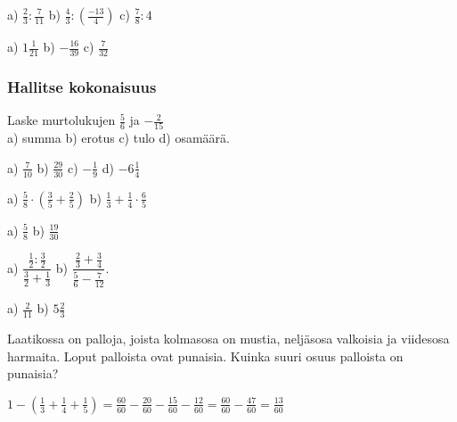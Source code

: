 \begin{tehtavasivu}
\begin{tehtava}
a) $\frac{2}{3} : \frac{7}{11}$ \qquad b) $\frac{4}{3}:(\frac{-13}{4})$ \qquad c) $\frac{7}{8}:4$
\begin{vastaus}
a) $1\frac{1}{21}$ \qquad b) $-\frac{16}{39}$ \qquad c) $\frac{7}{32}$
\end{vastaus}
\end{tehtava}

\subsubsection*{Hallitse kokonaisuus}

\begin{tehtava}
Laske murtolukujen $\frac{5}{6}$ ja $-\frac{2}{15}$ \\ a) summa \qquad b) erotus \qquad c) tulo \qquad d) osamäärä.
\begin{vastaus}
a) $\frac{7}{10}$ \qquad b) $\frac{29}{30}$ \qquad c) $-\frac{1}{9}$ \qquad d) $-6\frac{1}{4}$
\end{vastaus}
\end{tehtava}

\begin{tehtava}
a) $\frac{5}{8}\cdot(\frac{3}{5}+\frac{2}{5})$ \qquad b) $\frac{1}{3}+\frac{1}{4}\cdot\frac{6}{5}$
\begin{vastaus}
a) $\frac{5}{8}$ \qquad b) $\frac{19}{30}$
\end{vastaus}
\end{tehtava}

\begin{tehtava}
a) $\dfrac{\frac{1}{2}:\frac{3}{2}}{\frac{3}{2}+\frac{1}{3}}$ \qquad b) $\dfrac{\frac{2}{3}+\frac{3}{4}}{\frac{5}{6}-\frac{7}{12}}$.
\begin{vastaus}
a) $\frac{2}{11}$ \qquad b) $5\frac{2}{3}$
\end{vastaus}
\end{tehtava}

\begin{tehtava} 
        Laatikossa on palloja, joista kolmasosa on mustia, neljäsosa
        valkoisia ja viidesosa harmaita. Loput palloista ovat 		 	punaisia.
        Kuinka suuri osuus palloista on punaisia?
        
        \begin{vastaus}
            $1-(\frac{1}{3}+\frac{1}{4}+\frac{1}{5})
            = \frac{60}{60}-\frac{20}{60}-\frac{15}{60}-\frac{12}{60}
            = \frac{60}{60}-\frac{47}{60}
            = \frac{13}{60}$
        \end{vastaus}
    \end{tehtava}


\end{tehtavasivu}
